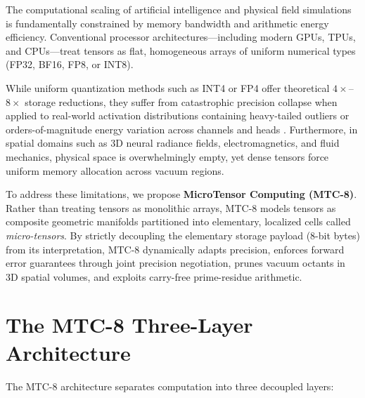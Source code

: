 \documentclass[11pt,a4paper]{article}
\begin{document}
The computational scaling of artificial intelligence and physical field simulations is fundamentally constrained by memory bandwidth and arithmetic energy efficiency. Conventional processor architectures—including modern GPUs, TPUs, and CPUs—treat tensors as flat, homogeneous arrays of uniform numerical types (FP32, BF16, FP8, or INT8).

While uniform quantization methods such as INT4 or FP4 offer theoretical $4\times$--$8\times$ storage reductions, they suffer from catastrophic precision collapse when applied to real-world activation distributions containing heavy-tailed outliers or orders-of-magnitude energy variation across channels and heads \cite{dettmers2022llm, xiao2023smoothquant, lin2023awq}. Furthermore, in spatial domains such as 3D neural radiance fields, electromagnetics, and fluid mechanics, physical space is overwhelmingly empty, yet dense tensors force uniform memory allocation across vacuum regions.

To address these limitations, we propose \textbf{MicroTensor Computing (MTC-8)}. Rather than treating tensors as monolithic arrays, MTC-8 models tensors as composite geometric manifolds partitioned into elementary, localized cells called \emph{micro-tensors}. By strictly decoupling the elementary storage payload (8-bit bytes) from its interpretation, MTC-8 dynamically adapts precision, enforces forward error guarantees through joint precision negotiation, prunes vacuum octants in 3D spatial volumes, and exploits carry-free prime-residue arithmetic.

\section{The MTC-8 Three-Layer Architecture}

The MTC-8 architecture separates computation into three decoupled layers:
\end{document}
